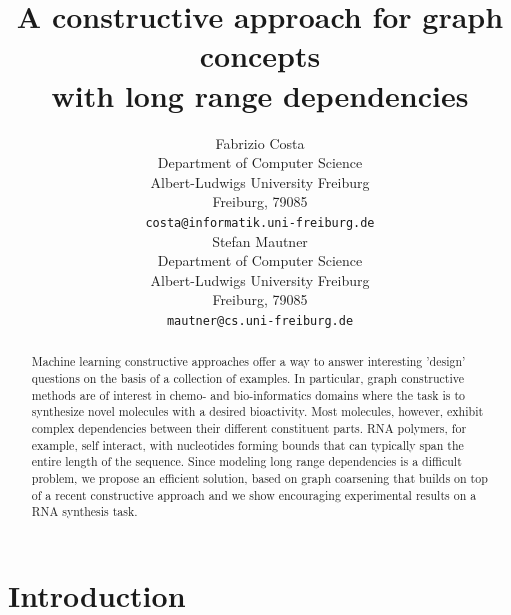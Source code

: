 \documentclass{article}
\title{A constructive approach for graph concepts\\with long range dependencies}
\author{
  Fabrizio Costa \\
  Department of Computer Science\\
  Albert-Ludwigs University Freiburg\\
  Freiburg, 79085  \\
  \texttt{costa@informatik.uni-freiburg.de} \\
  \And
  Stefan Mautner\\
  Department of Computer Science\\
  Albert-Ludwigs University Freiburg\\
  Freiburg, 79085  \\
  \texttt{mautner@cs.uni-freiburg.de} \\
}
\begin{document}

\maketitle

\begin{abstract}

Machine learning constructive approaches offer a way to answer interesting
'design' questions on the basis of a collection of examples.  In particular,
graph constructive methods are of interest in chemo- and bio-informatics
domains where the task is to synthesize novel molecules with a desired
bioactivity. Most molecules, however, exhibit complex dependencies between
their different constituent parts. RNA polymers, for example, self interact,
with nucleotides forming bounds that can typically span the entire length of
the sequence. Since modeling long range dependencies is a difficult problem,
we propose an efficient solution, based on graph coarsening that builds on top
of a recent constructive approach and we show encouraging experimental results
on a RNA synthesis task.





\end{abstract}
\section{Introduction}
\end{document}
